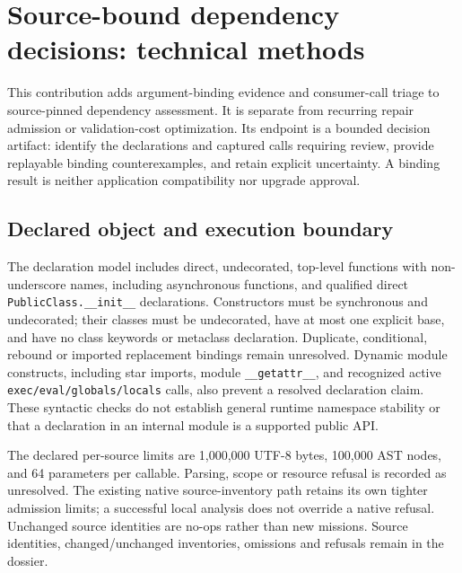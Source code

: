 \section{Source-bound dependency decisions: technical methods}
\label{app:binding-methods}

This contribution adds argument-binding evidence and consumer-call triage to
source-pinned dependency assessment. It is separate from recurring repair
admission or validation-cost optimization. Its endpoint is a bounded decision
artifact: identify the declarations and captured calls requiring review,
provide replayable binding counterexamples, and retain explicit uncertainty.
A binding result is neither application compatibility nor upgrade approval.

\subsection{Declared object and execution boundary}

The declaration model includes direct, undecorated, top-level functions with
non-underscore names, including asynchronous functions, and qualified direct
\texttt{PublicClass.\_\_init\_\_} declarations. Constructors must be synchronous
and undecorated; their classes must be undecorated, have at most one explicit
base, and have no class keywords or metaclass declaration. Duplicate,
conditional, rebound or imported replacement bindings remain unresolved.
Dynamic module constructs, including star imports, module
\texttt{\_\_getattr\_\_}, and recognized active
\texttt{exec/eval/globals/locals} calls, also prevent a resolved declaration
claim. These syntactic checks do not establish general runtime namespace
stability or that a declaration in an internal module is a supported public
API.

The declared per-source limits are 1,000,000 UTF-8 bytes, 100,000 AST nodes,
and 64 parameters per callable. Parsing, scope or resource refusal is recorded
as unresolved. The existing native source-inventory path retains its own
tighter admission limits; a successful local analysis does not override a
native refusal. Unchanged source identities are no-ops rather than new
missions. Source identities, changed/unchanged inventories, omissions and
refusals remain in the dossier.

